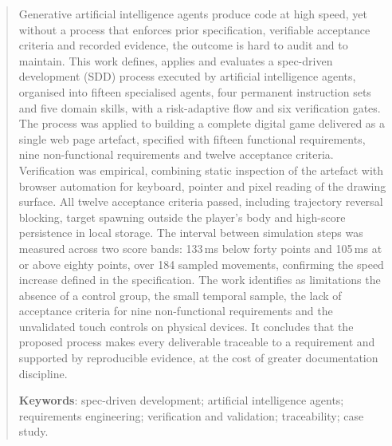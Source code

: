 \begin{abstract}
	Generative artificial intelligence agents produce code at high speed, yet
	without a process that enforces prior specification, verifiable acceptance
	criteria and recorded evidence, the outcome is hard to audit and to
	maintain. This work defines, applies and evaluates a spec-driven
	development (SDD) process executed by artificial intelligence agents,
	organised into fifteen specialised agents, four permanent instruction sets
	and five domain skills, with a risk-adaptive flow and six verification
	gates. The process was applied to building a complete digital game
	delivered as a single web page artefact, specified with fifteen functional
	requirements, nine non-functional requirements and twelve acceptance
	criteria. Verification was empirical, combining static inspection of the
	artefact with browser automation for keyboard, pointer and pixel reading of
	the drawing surface. All twelve acceptance criteria passed, including
	trajectory reversal blocking, target spawning outside the player's body and
	high-score persistence in local storage. The interval between simulation
	steps was measured across two score bands: 133\,ms below forty points and
	105\,ms at or above eighty points, over 184 sampled movements, confirming
	the speed increase defined in the specification. The work identifies as
	limitations the absence of a control group, the small temporal sample, the
	lack of acceptance criteria for nine non-functional requirements and the
	unvalidated touch controls on physical devices. It concludes that the
	proposed process makes every deliverable traceable to a requirement and
	supported by reproducible evidence, at the cost of greater documentation
	discipline.

	\vspace{\onelineskip}

	\noindent
	\textbf{Keywords}: spec-driven development; artificial intelligence agents;
	requirements engineering; verification and validation; traceability; case
	study.
\end{abstract}

\listoffigures
\newpage

